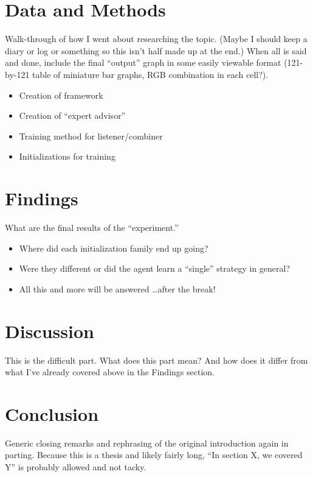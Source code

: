\documentclass[english]{tktltiki}
\begin{document}
\section{Data and Methods}


Walk-through of how I went about researching the topic.
%
(Maybe I should keep a diary or log or something so this isn't half made up
at the end.)
%
When all is said and done, include the final ``output'' graph in some easily
viewable format (121-by-121 table of miniature bar graphs, RGB combination in
each cell?).

\begin{itemize}
	\item Creation of framework
	\item Creation of ``expert advisor''
	\item Training method for listener/combiner
	\item Initializations for training
\end{itemize}


\section{Findings}


What are the final results of the ``experiment.''

\begin{itemize}
	\item Where did each initialization family end up going?
	\item Were they different or did the agent learn a ``single'' strategy
		in general?
	\item All this and more will be answered \ldots after the break!
\end{itemize}


\section{Discussion}


This is the difficult part.
%
What does this part mean?
%
And how does it differ from what I've already covered above in the Findings
section.


\section{Conclusion}


Generic closing remarks and rephrasing of the original introduction again
in parting.
%
Because this is a thesis and likely fairly long, ``In section X, we covered Y''
is probably allowed and not tacky.


\nocite{*}






\end{document}

